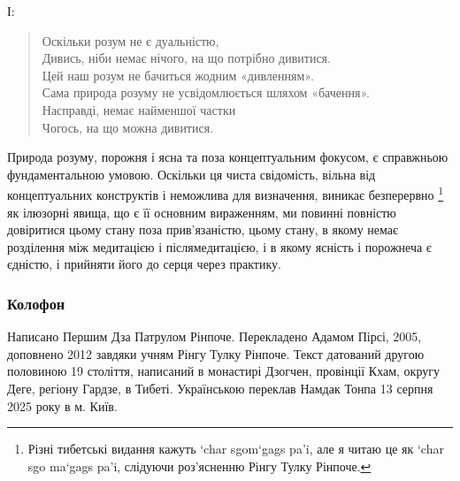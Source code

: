 \documentclass{article}
\begin{document}
І:

\begin{verse}
        Оскільки розум не є дуальністю, \\
        Дивись, ніби немає нічого, на що потрібно дивитися. \\
        Цей наш розум не бачиться жодним «дивленням». \\
        Сама природа розуму не усвідомлюється шляхом «бачення». \\
        Насправді, немає найменшої частки \\
        Чогось, на що можна дивитися.
\end{verse}

Природа розуму, порожня і ясна та поза концептуальним фокусом,
є справжньою фундаментальною умовою. Оскільки ця чиста свідомість,
вільна від концептуальних конструктів і неможлива для визначення,
виникає безперервно \footnote{Різні тибетські видання кажуть ‘char sgom‘gags pa’i, але я читаю це як ‘char sgo ma‘gags pa’i, слідуючи роз’ясненню Рінгу Тулку Рінпоче.} як ілюзорні явища, що є її основним вираженням,
ми повинні повністю довіритися цьому стану поза прив’язаністю,
цьому стану, в якому немає розділення між медитацією і післямедитацією,
і в якому ясність і порожнеча є єдністю, і прийняти його до серця через практику.

\vspace{1cm}

\subsubsection*{Колофон}
\footnotesize
Написано Першим Дза Патрулом Рінпоче. Перекладено Адамом Пірсі, 2005, доповнено 2012 завдяки учням Рінгу Тулку Рінпоче.
Текст датований другою половиною 19 століття, написаний в монастирі Дзогчен, провінції Кхам, округу Деге, регіону Гардзе, в Тибеті.
Українською переклав Намдак Тонпа 13 серпня 2025 року в м. Київ.
\end{document}
